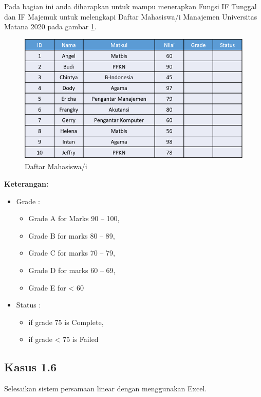 \documentclass[
]{book}
\providecommand{\tightlist}{%
  \setlength{\itemsep}{0pt}\setlength{\parskip}{0pt}}
\begin{document}
Pada bagian ini anda diharapkan untuk mampu menerapkan Fungsi IF Tunggal dan IF Majemuk untuk melengkapi Daftar Mahasiswa/i Manajemen Universitas Matana 2020 pada gambar \ref{fig:tabel5}.

\begin{figure}

{\centering \includegraphics[width=1\linewidth]{images/tabel5} 

}

\caption{Daftar Mahasiswa/i}\label{fig:tabel5}
\end{figure}

\textbf{Keterangan:}

\begin{itemize}
\item
  Grade :

  \begin{itemize}
  \tightlist
  \item
    Grade A for Marks 90 -- 100,
  \item
    Grade B for marks 80 -- 89,
  \item
    Grade C for marks 70 -- 79,
  \item
    Grade D for marks 60 -- 69,
  \item
    Grade E for \textless{} 60
  \end{itemize}
\item
  Status :

  \begin{itemize}
  \tightlist
  \item
    if grade 75 is Complete,
  \item
    if grade \textless{} 75 is Failed
  \end{itemize}
\end{itemize}

\hypertarget{kasus-1.6}{%
\subsection*{Kasus 1.6}\label{kasus-1.6}}

Selesaikan sistem persamaan linear dengan menggunakan Excel.

  
\end{document}
